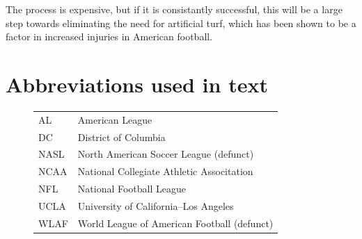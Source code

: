 The process is expensive, but if it is consistantly successful, this will be a
large step towards eliminating the need for artificial turf, which has been 
shown to be a factor in increased injuries in American football.

\section{Abbreviations used in text}
\begin{figure}[H]
\begin{tabular}{l l}
AL & American League \\
DC & District of Columbia \\
NASL & North American Soccer League (defunct) \\
NCAA & National Collegiate Athletic Associtation \\
NFL & National Football League \\
UCLA & University of California--Los Angeles \\
WLAF & World League of American Football (defunct) \\
\end{tabular}
\end{figure}

